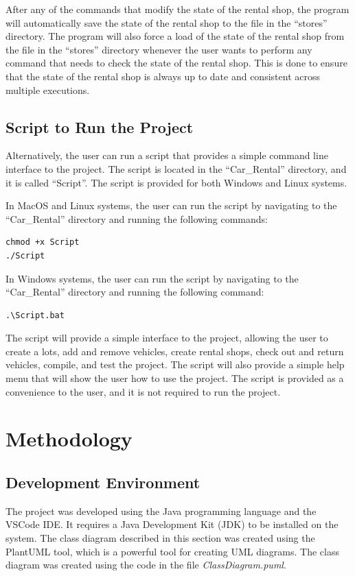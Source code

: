 \documentclass[conference]{IEEEtran}
\begin{document}
After any of the commands that modify the state of the rental shop, the program will automatically save the state of the rental shop to the file in the ``stores'' directory. The program will also force a load of the state of the rental shop from the file in the ``stores'' directory whenever the user wants to perform any command that needs to check the state of the rental shop. This is done to ensure that the state of the rental shop is always up to date and consistent across multiple executions.

\subsection{Script to Run the Project}
Alternatively, the user can run a script that provides a simple command line interface to the project. The script is located in the ``Car\_Rental'' directory, and it is called ``Script''. The script is provided for both Windows and Linux systems.

In MacOS and Linux systems, the user can run the script by navigating to the ``Car\_Rental'' directory and running the following commands:
\begin{lstlisting}[style=input]
chmod +x Script
./Script
\end{lstlisting}

In Windows systems, the user can run the script by navigating to the ``Car\_Rental'' directory and running the following command:
\begin{lstlisting}[style=input]
.\Script.bat
\end{lstlisting}

The script will provide a simple interface to the project, allowing the user to create a lots, add and remove vehicles, create rental shops, check out and return vehicles, compile, and test the project. The script will also provide a simple help menu that will show the user how to use the project. The script is provided as a convenience to the user, and it is not required to run the project.

\section{Methodology}
\subsection{Development Environment}
The project was developed using the Java programming language and the VSCode IDE. It requires a Java Development Kit (JDK) to be installed on the system. The class diagram described in this section was created using the PlantUML tool, which is a powerful tool for creating UML diagrams. The class diagram was created using the code in the file \textit{ClassDiagram.puml}.
\end{document}

